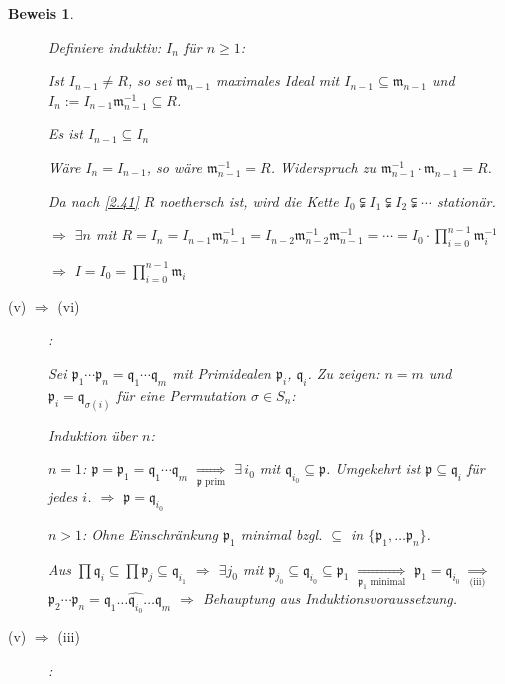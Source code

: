 \documentclass[a4paper,12pt]{scrbook}
\theoremstyle{break}
\theoremstyle{nonumberbreak}
\newtheorem{Bew}{Beweis}
\theoremstyle{nonumberplain}
\begin{document}
\begin{Bew}
\begin{description}
Definiere induktiv: $I_n$ für $n \geq 1$:

Ist $I_{n-1} \neq R$, so sei $\mathfrak{m}_{n-1}$ maximales Ideal mit $I_{n-1} \subseteq \mathfrak{m}_{n-1}$ und $I_n := I_{n-1} \mathfrak{m}_{n-1}^{-1} \subseteq R$.

Es ist $I_{n-1} \subseteq I_n$

Wäre $I_n = I_{n-1}$, so wäre $\mathfrak{m}_{n-1}^{-1} = R$. Widerspruch zu $\mathfrak{m}_{n-1}^{-1} \cdot \mathfrak{m}_{n-1} = R$.

Da nach \ref{2.41} $R$ noethersch ist, wird die Kette $I_0 \subsetneqq I_1 \subsetneqq I_2 \subsetneqq \cdots$ stationär.

$\Rightarrow$ $\exists n$ mit $R = I_n = I_{n-1} \mathfrak{m}_{n-1}^{-1} = I_{n-2} \mathfrak{m}_{n-2}^{-1} \mathfrak{m}_{n-1}^{-1} = \cdots = I_0 \cdot \prod_{i=0}^{n-1} \mathfrak{m}_{i}^{-1}$

$\Rightarrow$ $I = I_0 = \prod_{i=0}^{n-1} \mathfrak{m}_i$

\item[(v) $\Rightarrow$ (vi)]:

Sei $\mathfrak{p}_1 \cdots \mathfrak{p}_n = \mathfrak{q}_1 \cdots \mathfrak{q}_m$ mit Primidealen $\mathfrak{p}_i$, $\mathfrak{q}_i$. Zu zeigen: $n=m$ und $\mathfrak{p}_i = \mathfrak{q}_{\sigma(i)}$ für eine Permutation $\sigma \in S_n$:

Induktion über $n$:

$n=1$: $\mathfrak{p} = \mathfrak{p}_1 = \mathfrak{q}_1 \cdots \mathfrak{q}_m$ $\underset{\mathfrak{p}\text{ prim}}{\Rightarrow}$ $\exists\, i_0$ mit $\mathfrak{q}_{i_0} \subseteq \mathfrak{p}$. Umgekehrt ist $\mathfrak{p} \subseteq \mathfrak{q}_i$ für jedes $i$. $\Rightarrow$ $\mathfrak{p} = \mathfrak{q}_{i_0}$

$n>1$: Ohne Einschränkung $\mathfrak{p}_1$ minimal bzgl. $\subseteq$ in $\{ \mathfrak{p}_1, \ldots \mathfrak{p}_n \}$.

Aus $\prod \mathfrak{q}_i \subseteq \prod \mathfrak{p}_j \subseteq \mathfrak{q}_{i_1}$ $\Rightarrow$ $\exists j_0$ mit $\mathfrak{p}_{j_0} \subseteq \mathfrak{q}_{i_0} \subseteq \mathfrak{p}_1$ $\underset{\mathfrak{p}_1\text{ minimal}}{\Rightarrow}$ $\mathfrak{p}_1 = \mathfrak{q}_{i_0}$ $\underset{\text{(iii)}}{\Rightarrow}$ $\mathfrak{p}_2 \cdots \mathfrak{p}_n = \mathfrak{q}_1 \ldots \widehat{\mathfrak{q}_{i_0}} \ldots \mathfrak{q}_m$ $\Rightarrow$ Behauptung aus Induktionsvoraussetzung.

\item[(v) $\Rightarrow$ (iii)]:


\end{description}
\end{Bew}
\end{document}

